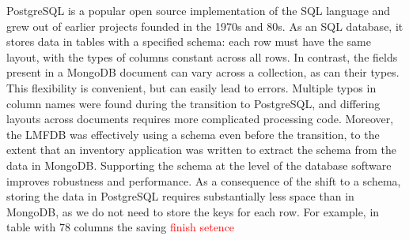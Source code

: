 \documentclass{article}
\newcommand{\todo}[1]{\textcolor{red}{#1}}
\begin{document}
PostgreSQL is a popular open source implementation of the SQL language and grew out of earlier projects founded in the 1970s and 80s.
As an SQL database, it stores data in tables with a specified schema: each row must have the same layout, with the types of columns constant across all rows.
In contrast, the fields present in a MongoDB document can vary across a collection, as can their types.
This flexibility is convenient, but can easily lead to errors.
Multiple typos in column names were found during the transition to PostgreSQL, and differing layouts across documents requires more complicated processing code.
Moreover, the LMFDB was effectively using a schema even before the transition, to the extent that an inventory application was written to extract the schema from the data in MongoDB.
Supporting the schema at the level of the database software improves robustness and performance.
As a consequence of the shift to a schema, storing the data in PostgreSQL requires substantially less space than in MongoDB, as we do not need to store the keys for each row.
For example, in table with 78 columns the saving 
\todo{finish setence}
\end{document}
